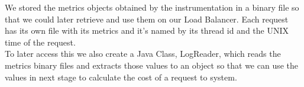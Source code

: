 \documentclass[times, 10pt,twocolumn]{article}
\begin{document}
   We stored the metrics objects obtained by the instrumentation in a binary
   file so that we could later retrieve and use them on our Load Balancer. Each 
   request has its own file with its metrics and it's named by its thread id 
   and the UNIX time of the request.\\
   To later access this we also create a Java Class, LogReader, which reads
   the metrics binary files and extracts those values to an object so that 
   we can use the values in next stage to calculate the cost of a request to
   system.




\nocite{ex1,ex2}


\end{document}
